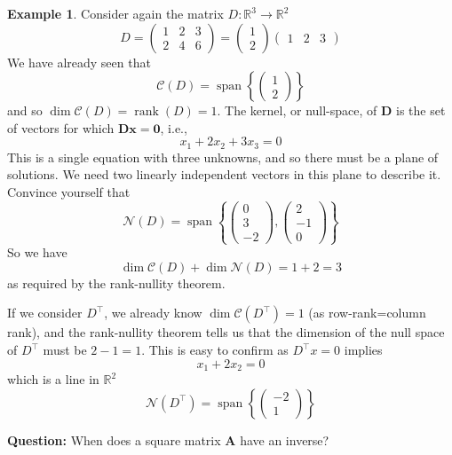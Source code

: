 \documentclass[]{book}
\theoremstyle{definition}
\theoremstyle{definition}
\newtheorem{example}{Example}[chapter]
\theoremstyle{definition}
\theoremstyle{remark}
\begin{document}
\begin{example}
\protect\hypertarget{exm:ranknullityeg}{}{\label{exm:ranknullityeg} }Consider again the matrix \(D: \mathbb{R}^3\rightarrow \mathbb{R}^2\)
\[ D=\left( \begin{array}{ccc} 1 & 2&3\\ 2&4&6 \end{array}\right)= \left( \begin{array}{c} 1 \\ 2 \end{array}\right)\left(\begin{array}{ccc}1&2&3\end{array}\right)
\]
We have already seen that
\[\mathcal{C}(D)=\operatorname{span}\left\{\left(\begin{array}{c}1\\2\end{array}\right)\right\}\]
and so \(\dim \mathcal{C}(D)=\operatorname{rank}(D)=1\).
The kernel, or null-space, of \(\mathbf D\) is the set of vectors for which \(\mathbf D\mathbf x=\boldsymbol 0\), i.e.,
\[x_1+2x_2+3x_3=0\]
This is a single equation with three unknowns, and so there must be a plane of solutions. We need two linearly independent vectors in this plane to describe it. Convince yourself that
\[\mathcal{N}(D) = \operatorname{span}\left\{\left(\begin{array}{c}0\\3\\-2\end{array}\right), \left(\begin{array}{c}2\\-1\\0\end{array}\right)\right\}\]
So we have
\[\dim \mathcal{C}(D)+\dim \mathcal{N}(D)=1+2=3\]
as required by the rank-nullity theorem.

If we consider \(D^\top\), we already know \(\dim \mathcal{C}(D^\top)=1\) (as row-rank=column rank), and the rank-nullity theorem tells us that the dimension of the null space of \(D^\top\) must be \(2-1=1\). This is easy to confirm as \(D^\top x=0\) implies
\[x_1+2x_2=0\]
which is a line in \(\mathbb{R}^2\)
\[\mathcal{N}(D^\top) = \operatorname{span}\left\{ \left(\begin{array}{c}-2\\1\end{array}\right)\right\}\]
\end{example}

\textbf{Question:} When does a square matrix \(\mathbf A\) have an inverse?
\end{document}
